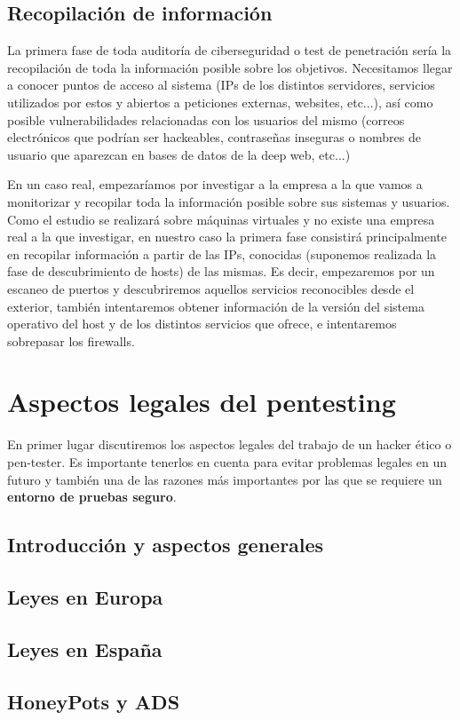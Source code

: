 \subsection{Recopilación de información}

La primera fase de toda auditoría de ciberseguridad o test de penetración sería la recopilación de toda la información posible sobre los objetivos. Necesitamos llegar a conocer puntos de acceso al sistema (IPs de los distintos servidores, servicios utilizados por estos y abiertos a peticiones externas, websites, etc...), así como posible vulnerabilidades relacionadas con los usuarios del mismo (correos electrónicos que podrían ser hackeables, contraseñas inseguras o nombres de usuario que aparezcan en bases de datos de la deep web, etc...)

En un caso real, empezaríamos por investigar a la empresa a la que vamos a monitorizar y recopilar toda la información posible sobre sus sistemas y usuarios. Como el estudio se realizará sobre máquinas virtuales y no existe una empresa real a la que investigar, en nuestro caso la primera fase consistirá principalmente en recopilar información a partir de las IPs, conocidas (suponemos realizada la fase de descubrimiento de hosts) de las mismas. Es decir, empezaremos por un escaneo de puertos y descubriremos aquellos servicios reconocibles desde el exterior, también intentaremos obtener información de la versión del sistema operativo del host y de los distintos servicios que ofrece, e intentaremos sobrepasar los firewalls. 


\section{Aspectos legales del pentesting}

En primer lugar discutiremos los aspectos legales del trabajo de un hacker ético o pen-tester. Es importante tenerlos en cuenta para evitar problemas legales en un futuro y también una de las razones más importantes por las que se requiere un \textbf{entorno de pruebas seguro}.

\subsection{Introducción y aspectos generales}
\subsection{Leyes en Europa}
\subsection{Leyes en España}



\subsection{HoneyPots y ADS}